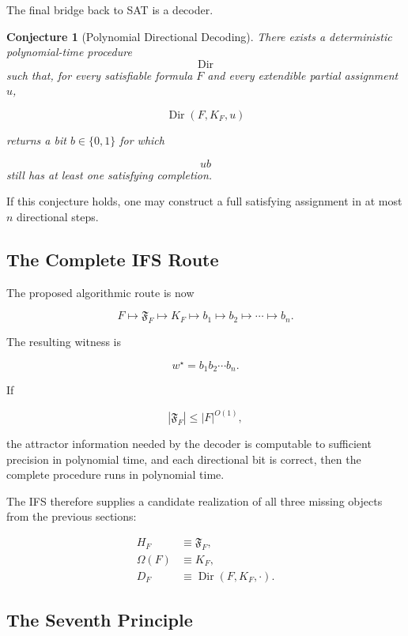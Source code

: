 \documentclass[11pt]{article}
\theoremstyle{plain}
\newtheorem{conjecture}[theorem]{Conjecture}
\theoremstyle{definition}
\begin{document}
The final bridge back to SAT is a decoder.

\begin{conjecture}[Polynomial Directional Decoding]
\label{conj:ifs-direction-decoding}
There exists a deterministic polynomial-time procedure
\[
    \operatorname{Dir}
\]
such that, for every satisfiable formula \(F\) and every extendible partial
assignment \(u\),

\[
    \operatorname{Dir}(F,K_F,u)
\]

returns a bit \(b\in\{0,1\}\) for which

\[
    ub
\]
still has at least one satisfying completion.
\end{conjecture}

If this conjecture holds, one may construct a full satisfying assignment in
at most \(n\) directional steps.

\subsection{The Complete IFS Route}

The proposed algorithmic route is now

\[
\boxed{
F
\longmapsto
\mathfrak{F}_F
\longmapsto
K_F
\longmapsto
b_1
\longmapsto
b_2
\longmapsto
\cdots
\longmapsto
b_n.
}
\]

The resulting witness is

\[
    w^\star=b_1b_2\cdots b_n.
\]

If

\[
    |\mathfrak{F}_F|
    \leq |F|^{O(1)},
\]

the attractor information needed by the decoder is computable to sufficient
precision in polynomial time, and each directional bit is correct, then the
complete procedure runs in polynomial time.

The IFS therefore supplies a candidate realization of all three missing
objects from the previous sections:

\[
\boxed{
\begin{aligned}
H_F
&\equiv
\mathfrak{F}_F,
\\[4pt]
\Omega(F)
&\equiv
K_F,
\\[4pt]
D_F
&\equiv
\operatorname{Dir}(F,K_F,\cdot).
\end{aligned}
}
\]

\subsection{The Seventh Principle}
\end{document}
